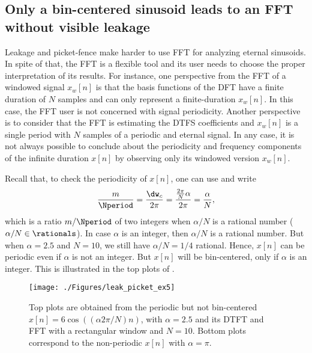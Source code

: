 \subsection{{\akadvanced} Only a bin-centered sinusoid leads to an FFT without visible leakage}

Leakage and picket-fence make harder to use FFT for analyzing eternal sinusoids.
In spite of that, the FFT is a flexible tool and its user needs to choose the proper
interpretation of its results.
For instance, one perspective from the FFT of a windowed signal $x_w[n]$ is that the basis
functions of the DFT have a finite duration of $N$ samples and can only represent a finite-duration $x_w[n]$.
In this case, the FFT user is not concerned with signal periodicity.
Another perspective is to consider that the FFT is estimating the DTFS coefficients and
$x_w[n]$ is a single period with $N$ samples of a periodic and eternal signal.
In any case, it is not always possible to conclude about the periodicity and
frequency components of the infinite duration $x[n]$ by observing only its windowed version
$x_w[n]$.


Recall that, to check the periodicity of $x[n]$, one can use  and write
\begin{equation}
\frac{m}{\Nperiod} = \frac{\dw_c}{2 \pi } = \frac{\frac{2 \pi}{N} \alpha}{2 \pi} = \frac{\alpha}{N},
\label{eq:sinusoid_alternative}
\end{equation}
which is a ratio $m/\Nperiod$ of two integers when $\alpha/N$ is a rational number ($\alpha/N \in \rationals$). 
In case $\alpha$ is an integer, then $\alpha/N$ is a rational number. But when $\alpha = 2.5$ and $N=10$, we still
have $\alpha/N = 1/4$ rational. Hence, $x[n]$ can be periodic even if $\alpha$ is not an integer. But $x[n]$
will be bin-centered, only if $\alpha$ is an integer. This is illustrated in the top plots of .

\begin{figure}[htbp]
\centering
\texttt{[image: ./Figures/leak\_picket\_ex5]}
\caption[Comparing FFT results for non-periodic and a periodic but not bin-centered signals.]{Top plots are obtained from the periodic but not bin-centered $x[n]=6\cos((\alpha 2 \pi /N) n)$, with $\alpha=2.5$ and its DTFT and FFT with a rectangular window and $N=10$. Bottom plots correspond to the non-periodic $x[n]$ with $\alpha=\pi$.\label{fig:leak_picket_ex5}}
\end{figure}

